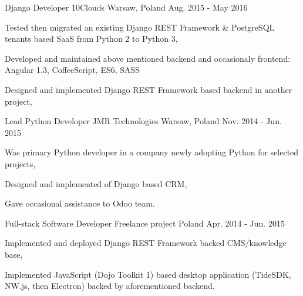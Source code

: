 \begin{cventries}
  \cventry
  {Django Developer} %
  {10Clouds} %
  {Warsaw, Poland} %
  {Aug. 2015 - May 2016} %
  {
    \begin{cvitems} %
      \item {Tested then migrated an existing Django REST Framework \& PostgreSQL tenants based SaaS from Python 2 to Python 3,}
      \item {Developed and maintained above mentioned backend and occasionaly frontend: Angular 1.3, CoffeeScript, ES6, SASS}
      \item {Designed and implemented Django REST Framework based backend in another project,}
    \end{cvitems}
  }

  \cventry
  {Lead Python Developer} %
  {JMR Technologies} %
  {Warsaw, Poland} %
  {Nov. 2014 - Jun. 2015} %
  {
    \begin{cvitems} %
      \item {Was primary Python developer in a company newly adopting Python for selected projects,}
      \item {Designed and implemented of Django based CRM,}
      \item {Gave occasional assistance to Odoo team.}
    \end{cvitems}
  }

  \cventry
  {Full-stack Software Developer} %
  {Freelance project} %
  {Poland} %
  {Apr. 2014 - Jun. 2015} %
  {
    \begin{cvitems} %
      \item {Implemented and deployed Django REST Framework backed CMS/knowledge base,}
      \item {Implemented JavaScript (Dojo Toolkit 1) based desktop application (TideSDK, NW.js, then Electron) backed by aforementioned backend.}
    \end{cvitems}
  }


\end{cventries}
